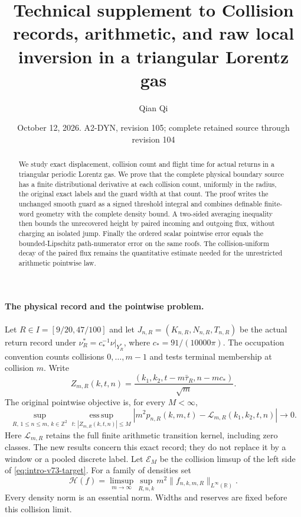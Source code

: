 \documentclass[11pt,reqno]{amsart}
\title[Technical supplement]{Technical supplement to Collision records, arithmetic, and raw local inversion in a triangular Lorentz gas}
\author{Qian Qi}
\date{October 12, 2026. A2-DYN, revision 105; complete retained source through revision 104}
\numberwithin{equation}{section}
\theoremstyle{definition}\newtheorem{definition}[theorem]{Definition}
\theoremstyle{remark}\newtheorem{remark}[theorem]{Remark}
\newcommand{\R}{\mathbb R}\newcommand{\Z}{\mathbb Z}\newcommand{\T}{\mathbb T}
\theoremstyle{definition}\newtheorem{inputstatement}[theorem]{Input statement}
\begin{document}
\raggedbottom
\begin{abstract}
We study exact displacement, collision count and flight time for actual
returns in a triangular periodic Lorentz gas. We prove that the complete
physical boundary source has a finite distributional derivative at each
collision count, uniformly in the radius, the original exact labels and
the guard width at that count. The proof writes the unchanged smooth
guard as a signed threshold integral and combines definable finite-word
geometry with the complete density bound. A two-sided averaging inequality
then bounds the unrecovered height by paired incoming and outgoing flux,
without charging an isolated jump. Finally the ordered scalar pointwise
error equals the bounded-Lipschitz path-numerator error on the same roofs.
The collision-uniform decay of the paired flux remains the quantitative
estimate needed for the unrestricted arithmetic pointwise law.
\end{abstract}
\maketitle

\paragraph{The physical record and the pointwise problem.}
Let $R\in I=[9/20,47/100]$ and let
$J_{n,R}=(K_{n,R},N_{n,R},T_{n,R})$ be the actual return record
under $\nu_R^*=c_*^{-1}\nu|_{Y_R^*}$, where $c_*=91/(10000\pi)$.
The occupation convention counts collisions $0,\ldots,m-1$ and tests
terminal membership at collision $m$. Write
\[
 Z_{m,R}(k,t,n)=\frac{(k_1,k_2,t-m\bar\tau_R,n-mc_*)}{\sqrt m}.
\]
The original pointwise objective is, for every $M<\infty$,
\begin{equation}\label{eq:intro-v73-target}
 \sup_{R,\,1\le n\le m,\,k\in\Z^2}
 \operatorname*{ess\,sup}_{t:\,|Z_{m,R}(k,t,n)|\le M}
 |m^2p_{n,R}(k,m,t)-\mathcal L_{m,R}(k_1,k_2,t,n)|\longrightarrow0.
\end{equation}
Here $\mathcal L_{m,R}$ retains the full finite arithmetic transition
kernel, including zero classes. The new results concern this exact
record; they do not replace it by a window or a pooled discrete label.
Let $\mathcal E_M$ be the collision limsup of the left side of
\eqref{eq:intro-v73-target}. For a family of densities set
\begin{equation}\label{eq:intro-v73-ordered-height}
 \mathcal H(f)=\limsup_{m\to\infty}\sup_{R,n,k}m^2
                         \|f_{n,k,m,R}\|_{L^\infty(\R)}.
\end{equation}
Every density norm is an essential norm. Widths and reserves are fixed
before this collision limit.
\end{document}
